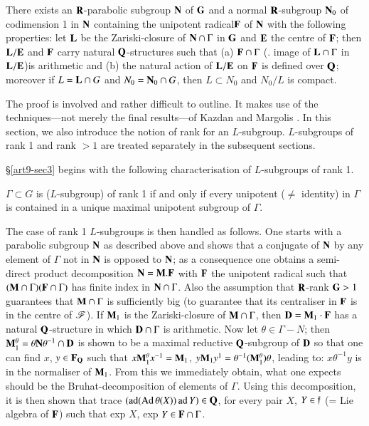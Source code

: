There exists an $\mathbf{R}$-parabolic subgroup $\mathbf{N}$ of $\mathbf{G}$ and a normal $\mathbf{R}$-subgroup $\mathbf{N}_0$ of codimension  1 in $\mathbf{N}$ containing the unipotent radical\pageoriginale  $\mathbf{F}$ of $\mathbf{N}$ with the following properties: let $\mathbf{L}$ be the Zariski-closure of $\mathbf{N} \cap \Gamma$  in $\mathbf{G}$ and $\mathbf{E}$ the centre of $\mathbf{F}$; then $\mathbf{L}/\mathbf{E}$ and $\mathbf{F}$ carry natural $\mathbf{Q}$-structures such that (a) $\mathbf{F} \cap \Gamma$ (\resp. image of $\mathbf{L}\cap \Gamma$ in $\mathbf{L}/ \mathbf{E}$)is arithmetic and (b) the natural action of $\mathbf{L}/\mathbf{E}$ on $\mathbf{F}$ is defined over $\mathbf{Q}$; moreover if $L = \mathbf{L} \cap G$ and $N_0 = \mathbf{N}_0 \cap G$, then $L \subset N_0$ and $N_0/ L$ is compact.

The proof is involved and rather difficult to outline. It makes use of the techniques---not merely the final results---of Kazdan and Margolis \cite{art9-key1}. In this section, we also introduce the notion of rank for an $L$-subgroup. $L$-subgroups of rank 1 and rank $> 1$ are treated separately in the subsequent sections.

\S\ref{art9-sec3} begins with the following characterisation of $L$-subgroups of rank 1. 

$\Gamma \subset G$ is ($L$-subgroup) of rank 1 if and only if every unipotent ($\neq$ identity) in $\Gamma$ is contained in a unique maximal unipotent subgroup of $\Gamma$.

The case of rank 1 $L$-subgroups is then handled as follows. One starts with a parabolic subgroup $\mathbf{N}$ as described above and shows that a conjugate of $\mathbf{N}$ by any element of $\Gamma$ not in $\mathbf{N}$ is opposed to $\mathbf{N}$; as a consequence one obtains a semi-direct product decomposition $\mathbf{N} = \mathbf{M}. \mathbf{F}$ with $\mathbf{F}$ the unipotent radical such that $(\mathbf{M} \cap \Gamma) (\mathbf{F} \cap \Gamma)$  has finite index in $\mathbf{N} \cap \Gamma$. Also the assumption that $\mathbf{R}$-rank $\mathbf{G}>1$ guarantees that $\mathbf{M} \cap \Gamma$ is sufficiently big (to guarantee that its centraliser in $\mathbf{F}$ is in the centre of $\mathscr{F}$). If $\mathbf{M}_1$ is the Zariski-closure of $\mathbf{M} \cap \Gamma$, then $\mathbf{D} = \mathbf{M}_1 \cdot \mathbf{F}$ has a natural $\mathbf{Q}$-structure in which $\mathbf{D} \cap \Gamma$ is arithmetic. Now let $\theta \in \Gamma -N$; then $\mathbf{M}^\theta_1 = \theta \mathbf{N} \theta^{-1} \cap \mathbf{D}$ is shown to be a maximal reductive $\mathbf{Q}$-subgroup of $\mathbf{D}$ so that one can find $x$, $y \in \mathbf{F}_{\mathbf{Q}}$ such that $x \mathbf{M}^\theta_1 x^{-1} = \mathbf{M}_1$, $y \mathbf{M}_1 y^{1} = \theta^{-1} (\mathbf{M}^\theta_1) \theta$, leading to: $x\theta^{-1} y$ is in the normaliser of $\mathbf{M}_1$. From this we immediately obtain, what one expects should be the Bruhat-decomposition of elements of $\Gamma$. Using this decomposition, it is then shown that trace $(\operatorname{ad}(\operatorname{Ad} \theta (X)) \operatorname{ad} Y) \in \mathbf{Q}$, for every pair $X$, $Y \in \mathfrak{f}$ (= Lie algebra of $\mathbf{F}$) such that exp $X$, exp $Y \in \mathbf{F} \cap \Gamma$.

